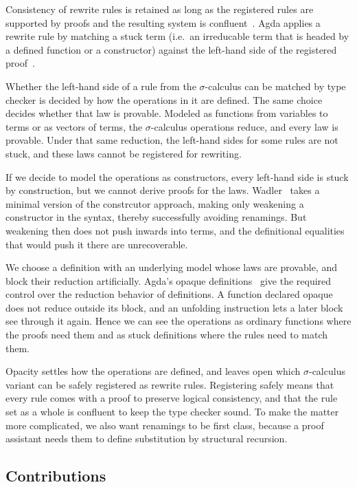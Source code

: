 \documentclass[sigplan,anonymous,review]{acmart}
\theoremstyle{acmdefinition}
\begin{document}
Consistency of rewrite rules is retained as long as the registered rules are
supported by proofs and the resulting system is
confluent~\cite{10.1145/3434341}. Agda applies a rewrite rule by matching a
stuck term (i.e.\ an irreducable term that is headed by a defined function or a
constructor) against the left-hand side of the registered
proof~\cite{10.1007/978-3-642-21691-6_5}.

Whether the left-hand side of a rule from the $σ$-calculus can be matched by
type checker is decided by how the operations in it are defined. The same
choice decides whether that law is provable. Modeled as functions from
variables to terms or as vectors of terms, the $σ$-calculus operations reduce,
and every law is provable. Under that same reduction, the left-hand sides for
some rules are not stuck, and these laws cannot be registered for rewriting.

If we decide to model the operations as constructors, every left-hand side is
stuck by construction, but we cannot derive proofs for the laws.
Wadler~\cite{Wadler_2024} takes a minimal version of the constrcutor approach,
making only weakening a constructor in the syntax, thereby successfully
avoiding renamings. But weakening then does not push inwards into terms, and
the definitional equalities that would push it there are unrecoverable.

We choose a definition with an underlying model whose laws are provable, and
block their reduction artificially. Agda's opaque
definitions~\cite{gratzer2022controlling} give the required control over the
reduction behavior of definitions. A function declared opaque does not reduce
outside its block, and an unfolding instruction lets a later block see through
it again. Hence we can see the operations as ordinary functions where the
proofs need them and as stuck definitions where the rules need to match them.

Opacity settles how the operations are defined, and leaves open which
$σ$-calculus variant can be safely registered as rewrite rules. Registering
safely means that every rule comes with a proof to preserve logical
consistency, and that the rule set as a whole is confluent to keep the type
checker sound. To make the matter more complicated, we also want renamings to
be first class, because a proof assistant needs them to define substitution by
structural recursion.
\subsection*{Contributions}
\end{document}
